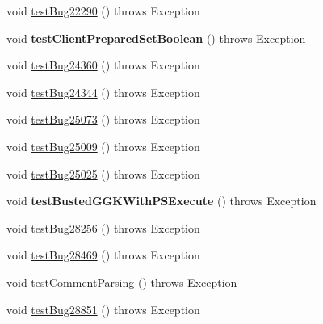 \begin{DoxyCompactItemize}
\item 
void \mbox{\hyperlink{classtestsuite_1_1regression_1_1_statement_regression_test_ae2acdb736d0a4481a43f894bd9f40499}{test\+Bug22290}} ()  throws Exception 
\item 
\mbox{\label{classtestsuite_1_1regression_1_1_statement_regression_test_ac16a79beb37a6d25b917a295dae9828d}} 
void {\bfseries test\+Client\+Prepared\+Set\+Boolean} ()  throws Exception 
\item 
void \mbox{\hyperlink{classtestsuite_1_1regression_1_1_statement_regression_test_a3334c82a4ef7ac982bf6eca6fc081027}{test\+Bug24360}} ()  throws Exception 
\item 
void \mbox{\hyperlink{classtestsuite_1_1regression_1_1_statement_regression_test_a4da675927e9f55846b0ea0781c439c48}{test\+Bug24344}} ()  throws Exception 
\item 
void \mbox{\hyperlink{classtestsuite_1_1regression_1_1_statement_regression_test_a67cdc2b43a1d7ac490ee30dd639ebd48}{test\+Bug25073}} ()  throws Exception 
\item 
void \mbox{\hyperlink{classtestsuite_1_1regression_1_1_statement_regression_test_a857b7ade8c7c4e47bd7f0c8340d91386}{test\+Bug25009}} ()  throws Exception 
\item 
void \mbox{\hyperlink{classtestsuite_1_1regression_1_1_statement_regression_test_ae15552bf551f9a8b5b291264142f57ae}{test\+Bug25025}} ()  throws Exception 
\item 
\mbox{\label{classtestsuite_1_1regression_1_1_statement_regression_test_a4f411a83be8c28b4a75b6292e50e00d7}} 
void {\bfseries test\+Busted\+G\+G\+K\+With\+P\+S\+Execute} ()  throws Exception 
\item 
void \mbox{\hyperlink{classtestsuite_1_1regression_1_1_statement_regression_test_a45f6666d2a8fbbc59bb210cd6e6f33a5}{test\+Bug28256}} ()  throws Exception 
\item 
void \mbox{\hyperlink{classtestsuite_1_1regression_1_1_statement_regression_test_aa43369797070b07cf82bd806ef218255}{test\+Bug28469}} ()  throws Exception 
\item 
void \mbox{\hyperlink{classtestsuite_1_1regression_1_1_statement_regression_test_a21dd6e188a7b72c29bcab2bbd7cabbeb}{test\+Comment\+Parsing}} ()  throws Exception 
\item 
void \mbox{\hyperlink{classtestsuite_1_1regression_1_1_statement_regression_test_a466a50de4804c830422e6b7e6a9c9653}{test\+Bug28851}} ()  throws Exception 

\end{DoxyCompactItemize}
